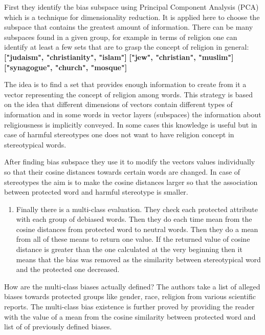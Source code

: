 \documentclass[12pt,]{book}
\providecommand{\tightlist}{%
  \setlength{\itemsep}{0pt}\setlength{\parskip}{0pt}}
\begin{document}
First they identify the bias subspace using Principal Component Analysis
(PCA) which is a technique for dimensionality reduction. It is applied
here to choose the subspace that contains the greatest amount of
information. There can be many subspaces found in a given group, for
example in terms of religion one can identify at least a few sets that
are to grasp the concept of religion in general: \newline
\textbf{["judaism", "christianity", "islam"]} \newline
\textbf{["jew", "christian", "muslim"]} \newline
\textbf{["synagogue", "church", "mosque"]} \newline

The idea is to find a set that provides enough information to create
from it a vector representing the concept of religion among words. This
strategy is based on the idea that different dimensions of vectors
contain different types of information and in some words in vector
layers (subspaces) the information about religiousness is implicitly
conveyed. In some cases this knowledge is useful but in case of harmful
stereotypes one does not want to have religion concept in stereotypical
words.

After finding bias subspace they use it to modify the vectors values
individually so that their cosine distances towards certain words are
changed. In case of stereotypes the aim is to make the cosine distances
larger so that the association between protected word and harmful
stereotype is smaller.

\begin{enumerate}
\def\labelenumi{\arabic{enumi}.}
\setcounter{enumi}{3}
\tightlist
\item
  Finally there is a multi-class evaluation. They check each protected
  attribute with each group of debiased words. Then they do each time
  mean from the cosine distances from protected word to neutral words.
  Then they do a mean from all of these means to return one value. If
  the returned value of cosine distance is greater than the one
  calculated at the very beginning then it means that the bias was
  removed as the similarity between stereotypical word and the protected
  one decreased.
\end{enumerate}

How are the multi-class biases actually defined? The authors take a list
of alleged biases towards protected groups like gender, race, religion
from various scientific reports. The multi-class bias existence is
further proved by providing the reader with the value of a mean from the
cosine similarity between protected word and list of of previously
defined biases.
\end{document}
